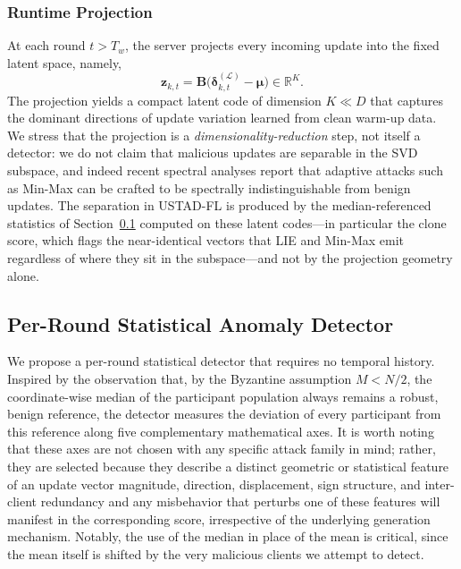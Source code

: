 \documentclass[journal]{IEEEtran}
\begin{document}
\subsubsection{Runtime Projection}
At each round $t > T_w$, the server projects every incoming update into the fixed latent space, namely,
\begin{equation}
\mathbf{z}_{k,t} = \mathbf{B}\bigl(\boldsymbol{\delta}_{k,t}^{(\mathcal{L})} - \boldsymbol{\mu}\bigr) \in \mathbb{R}^K.
\label{eq:projection}
\end{equation}
The projection yields a compact latent code of dimension $K \ll D$ that captures the dominant directions of update variation learned from clean warm-up data. We stress that the projection is a \emph{dimensionality-reduction} step, not itself a detector: we do not claim that malicious updates are separable in the SVD subspace, and indeed recent spectral analyses report that adaptive attacks such as Min-Max can be crafted to be spectrally indistinguishable from benign updates. The separation in USTAD-FL is produced by the median-referenced statistics of Section~\ref{sec:stat_detector} computed on these latent codes---in particular the clone score, which flags the near-identical vectors that LIE and Min-Max emit regardless of where they sit in the subspace---and not by the projection geometry alone.

\subsection{Per-Round Statistical Anomaly Detector}
\label{sec:stat_detector}

We propose a per-round statistical detector that requires no temporal history. Inspired by the observation that, by the Byzantine assumption $M < N/2$, the coordinate-wise median of the participant population always remains a robust, benign reference, the detector measures the deviation of every participant from this reference along five complementary mathematical axes. It is worth noting that these axes are not chosen with any specific attack family in mind; rather, they are selected because they describe a distinct geometric or statistical feature of an update vector magnitude, direction, displacement, sign structure, and inter-client redundancy and any misbehavior that perturbs one of these features will manifest in the corresponding score, irrespective of the underlying generation mechanism. Notably, the use of the median in place of the mean is critical, since the mean itself is shifted by the very malicious clients we attempt to detect.
\end{document}
